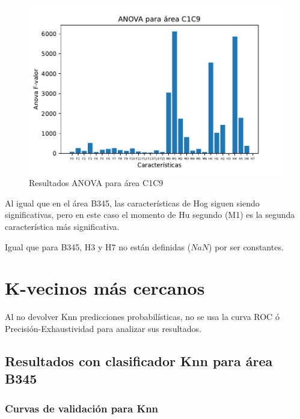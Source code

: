 \begin{figure}[H]
	\centering
	\captionsetup{justification=centering}
	\includegraphics[width=\textwidth]{imagenes/resultados/anova/ANOVA_C1C9.pdf}
	\caption{Resultados ANOVA para área C1C9}
\end{figure}

Al igual que en el área B345, las características de Hog siguen siendo significativas, pero en este caso el momento de Hu segundo (M1) es la segunda característica más significativa.

Igual que para B345, H3 y H7 no están definidas ($NaN$) por ser constantes.


\section{K-vecinos más cercanos}

Al no devolver Knn predicciones probabilísticas, no se usa la curva ROC ó Precisión-Exhaustividad para analizar sus resultados.

\subsection{Resultados con clasificador Knn para área B345}

\subsubsection{Curvas de validación para Knn}

